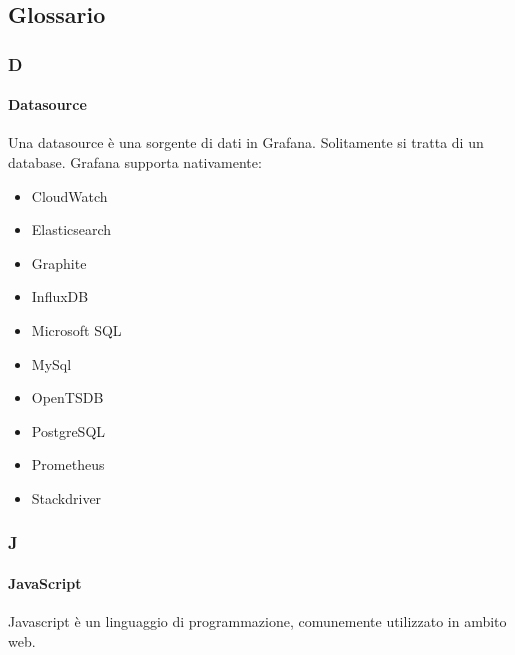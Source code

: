 \subsection{Glossario}
\subsubsection{D}

\paragraph{Datasource} \Spazio
\label{sec:datasource} 
Una datasource è una sorgente di dati in Grafana. Solitamente si tratta di un database. Grafana supporta nativamente:
	\begin{itemize}
	\item CloudWatch
	\item Elasticsearch
	\item Graphite
	\item InfluxDB
	\item Microsoft SQL
	\item MySql
	\item OpenTSDB
	\item PostgreSQL
	\item Prometheus
	\item Stackdriver
	\end{itemize}


\subsubsection{J}

	\paragraph{JavaScript} \Spazio
	\label{sec:javascript}
	Javascript è un linguaggio di programmazione, comunemente utilizzato in ambito web.